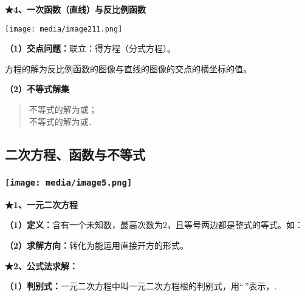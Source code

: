 \documentclass[a4paper,11pt,UTF8]{ctexart}
\begin{document}
\textbf{★4、一次函数（直线）与反比例函数}

\texttt{[image: media/image211.png]}

\textbf{（1）交点问题：}联立：得方程（分式方程）。

方程的解为反比例函数的图像与直线的图像的交点的横坐标的值。

\textbf{（2）不等式解集}

\begin{quote}
不等式的解为或；\\
不等式的解为或．
\end{quote}

\hypertarget{ux4e8cux6b21ux65b9ux7a0bux51fdux6570ux4e0eux4e0dux7b49ux5f0f}{%
\subsection{\texorpdfstring{
二次方程、函数与不等式}{ 二次方程、函数与不等式}}\label{ux4e8cux6b21ux65b9ux7a0bux51fdux6570ux4e0eux4e0dux7b49ux5f0f}}

\hypertarget{ux5b66ux79d1ux7f51www.zxxk.com--ux6559ux80b2ux8d44ux6e90ux95e8ux6237ux63d0ux4f9bux8bd5ux9898ux8bd5ux5377ux6559ux6848ux8bfeux4ef6ux6559ux5b66ux8bbaux6587ux7d20ux6750ux7b49ux5404ux7c7bux6559ux5b66ux8d44ux6e90ux5e93ux4e0bux8f7dux8fd8ux6709ux5927ux91cfux4e30ux5bccux7684ux6559ux5b66ux8d44ux8baf-38}{%
\subsubsection{\texorpdfstring{\protect\texttt{[image: media/image5.png]}}{学科网(www.zxxk.com)-\/-教育资源门户，提供试题试卷、教案、课件、教学论文、素材等各类教学资源库下载，还有大量丰富的教学资讯！}}\label{ux5b66ux79d1ux7f51www.zxxk.com--ux6559ux80b2ux8d44ux6e90ux95e8ux6237ux63d0ux4f9bux8bd5ux9898ux8bd5ux5377ux6559ux6848ux8bfeux4ef6ux6559ux5b66ux8bbaux6587ux7d20ux6750ux7b49ux5404ux7c7bux6559ux5b66ux8d44ux6e90ux5e93ux4e0bux8f7dux8fd8ux6709ux5927ux91cfux4e30ux5bccux7684ux6559ux5b66ux8d44ux8baf-38}}

\textbf{★1、一元二次方程}

\textbf{（1）定义：}含有一个未知数，最高次数为2，且等号两边都是整式的等式。如：

\textbf{（2）求解方向：}转化为能运用直接开方的形式。

\textbf{★2、公式法求解：}

\textbf{（1）判别式：}一元二次方程中叫一元二次方程根的判别式，用``\,''表示，.
\end{document}
